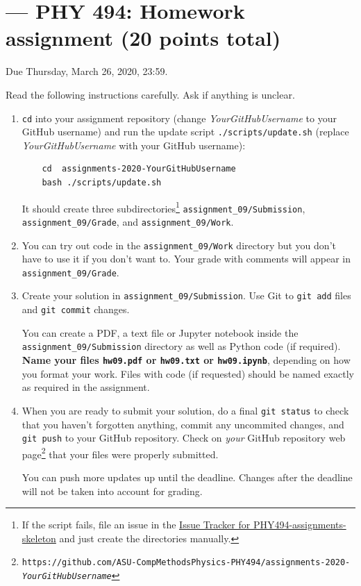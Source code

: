 \documentclass[letterpaper]{scrartcl}
\newcommand{\anumber}{9}
\newcommand{\anum}{0\anumber}
\begin{document}

\setcounter{section}{\anumber}
\addtocounter{section}{-1}
\section{ --- PHY 494: Homework assignment (20 points total)}

\noindent Due Thursday, March 26, 2020, 23:59.

\noindent
Read the following instructions carefully. Ask if anything is unclear.
\begin{enumerate}
\item \texttt{cd} into your assignment repository (change
  \emph{YourGitHubUsername} to your GitHub username) and run the
  update script \texttt{./scripts/update.sh} (replace
  \emph{YourGitHubUsername} with your GitHub username):
  \begin{verbatim}
    cd  assignments-2020-YourGitHubUsername
    bash ./scripts/update.sh
  \end{verbatim}
  It should create three subdirectories\footnote{If the script fails,
    file an issue in the
    \href{https://github.com/ASU-CompMethodsPhysics-PHY494/PHY494-assignments-skeleton/issues}{Issue
      Tracker for PHY494-assignments-skeleton} and just create the
    directories manually.} \texttt{assignment\_\anum/Submission},
  \texttt{assignment\_\anum/Grade}, and
  \texttt{assignment\_\anum/Work}.
\item You can try out code in the \texttt{assignment\_\anum/Work}
  directory but you don't have to use it if you don't want to. Your
  grade with comments will appear in
  \texttt{assignment\_\anum/Grade}.
\item Create your solution in
  \texttt{assignment\_\anum/Submission}. Use Git to \texttt{git
    add} files and \texttt{git commit} changes.

  You can create a PDF, a text file or Jupyter notebook inside the
  \texttt{assignment\_\anum/Submission} directory as well as Python
  code (if required). \textbf{Name your files \texttt{hw\anum.pdf} or
    \texttt{hw\anum.txt} or \texttt{hw\anum.ipynb}}, depending on how
  you format your work. Files with code (if requested) should be named
  exactly as required in the assignment.
\item When you are ready to submit your solution, do a final
  \texttt{git status} to check that you haven't forgotten anything,
  commit any uncommited changes, and \texttt{git push} to your GitHub
  repository. Check on \emph{your} GitHub repository web
  page\footnote{\texttt{https://github.com/ASU-CompMethodsPhysics-PHY494/assignments-2020-\emph{YourGitHubUsername}}}
  that your files were properly submitted.

  You can push more updates up until the deadline. Changes after the
  deadline will not be taken into account for grading.
\end{enumerate}
\end{document}
